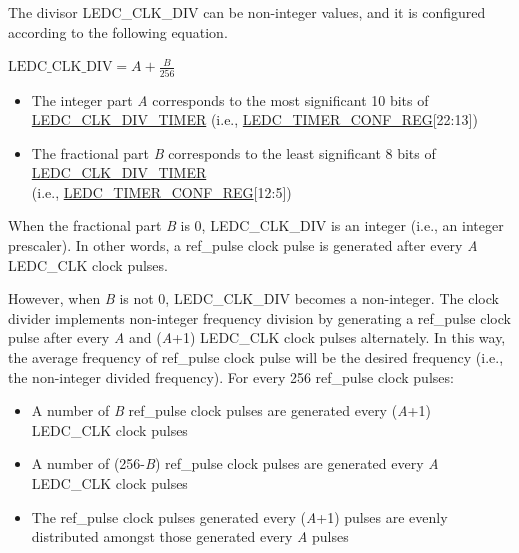 \documentclass[main\_\_EN.tex]{subfiles}
\begin{document}
The divisor LEDC\_CLK\_DIV can be non-integer values, and it is configured according to the following equation.

\begin{center}
$\textrm{LEDC\_CLK\_DIV} = A + \frac{B}{256}$
\end{center}

\begin{itemize}
    \item The integer part \textit{A} corresponds to the most significant 10 bits of \hyperref[fielddesc:LEDCCLKDIVTIMERX]{LEDC\_CLK\_DIV\_TIMER} (i.e., \hyperref[regdesc:LEDCTIMERXCONFREG]{LEDC\_TIMER\_CONF\_REG}[22:13])
    \item The fractional part \textit{B} corresponds to the least significant 8 bits of \hyperref[fielddesc:LEDCCLKDIVTIMERX]{LEDC\_CLK\_DIV\_TIMER} \\(i.e., \hyperref[regdesc:LEDCTIMERXCONFREG]{LEDC\_TIMER\_CONF\_REG}[12:5])
\end{itemize}

When the fractional part \textit{B} is 0, LEDC\_CLK\_DIV is an integer (i.e., an integer prescaler). In other words, a ref\_pulse clock pulse is generated after every \textit{A} LEDC\_CLK clock pulses.

However, when \textit{B} is not 0, LEDC\_CLK\_DIV becomes a non-integer. The clock divider implements non-integer frequency division by generating a ref\_pulse clock pulse after every \textit{A} and (\textit{A}+1) LEDC\_CLK clock pulses alternately. In this way, the average frequency of ref\_pulse clock pulse will be the desired frequency (i.e., the non-integer divided frequency). For every 256 ref\_pulse clock pulses:

\begin{itemize}
    \item A number of \textit{B} ref\_pulse clock pulses are generated every (\textit{A}+1) LEDC\_CLK clock pulses
    \item A number of (256-\textit{B}) ref\_pulse clock pulses are generated every \textit{A} LEDC\_CLK clock pulses
    \item The ref\_pulse clock pulses generated every (\textit{A}+1) pulses are evenly distributed amongst those generated every \textit{A} pulses
\end{itemize}
\end{document}
